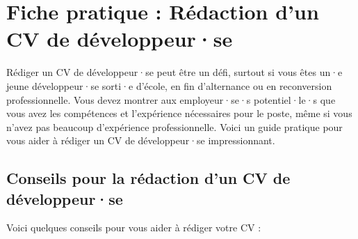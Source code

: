 \chapter{Fiche pratique : Rédaction d'un CV de développeur·se}

Rédiger un CV de développeur·se peut être un défi, surtout si vous êtes un·e jeune développeur·se sorti·e d'école, en fin d'alternance ou en reconversion professionnelle. Vous devez montrer aux employeur·se·s potentiel·le·s que vous avez les compétences et l'expérience nécessaires pour le poste, même si vous n'avez pas beaucoup d'expérience professionnelle. Voici un guide pratique pour vous aider à rédiger un CV de développeur·se impressionnant.

\section{Conseils pour la rédaction d'un CV de développeur·se}

Voici quelques conseils pour vous aider à rédiger votre CV :

